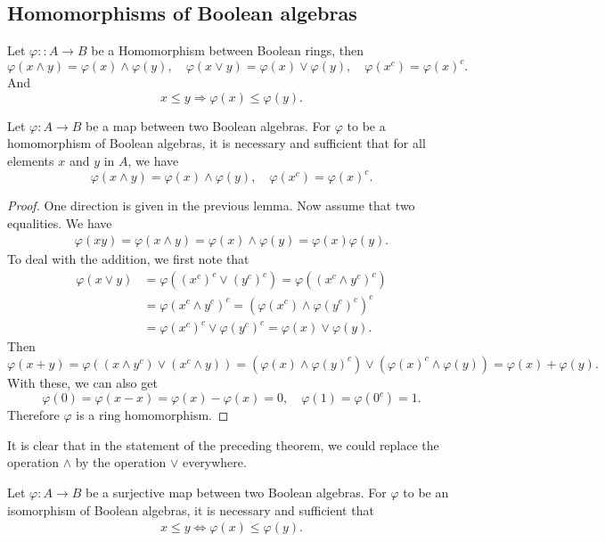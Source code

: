 \subsection{Homomorphisms of Boolean algebras}
\begin{lemma}\label{Bool ring homomorphism prop}
Let $\varphi::A\to B$ be a Homomorphism between Boolean rings, then
\[\varphi(x\wedge y)=\varphi(x)\wedge\varphi(y),\quad \varphi(x\vee y)=\varphi(x)\vee\varphi(y),\quad \varphi(x^c)=\varphi(x)^c.\]
And
\[x\leq y\Rightarrow \varphi(x)\leq\varphi(y).\]
\end{lemma}
\begin{theorem}\label{Bool ring homomorphism iff}
Let $\varphi:A\to B$ be a map between two Boolean algebras. For $\varphi$ to be a homomorphism of Boolean algebras, it is necessary 
and sufficient that for all elements $x$ and $y$ in $A$, we have
\[\varphi(x\wedge y)=\varphi(x)\wedge\varphi(y),\quad \varphi(x^c)=\varphi(x)^c.\]
\end{theorem}
\begin{proof}
One direction is given in the previous lemma. Now assume that two equalities. We have
\begin{align*}
\varphi(xy)=\varphi(x\wedge y)=\varphi(x)\wedge\varphi(y)=\varphi(x)\varphi(y).
\end{align*}
To deal with the addition, we first note that
\begin{align*}
\varphi(x\vee y)&=\varphi((x^c)^c\vee (y^c)^c)=\varphi((x^c\wedge y^c)^c)\\
&=\varphi(x^c\wedge y^c)^c=(\varphi(x^c)\wedge\varphi(y^c)^c)^c\\
&=\varphi(x^c)^c\vee\varphi(y^c)^c=\varphi(x)\vee\varphi(y).
\end{align*}
Then
\[\varphi(x+y)=\varphi((x\wedge y^c)\vee(x^c\wedge y))=(\varphi(x)\wedge\varphi(y)^c)\vee(\varphi(x)^c\wedge\varphi(y))=\varphi(x)+\varphi(y).\]
With these, we can also get
\[\varphi(0)=\varphi(x-x)=\varphi(x)-\varphi(x)=0,\quad \varphi(1)=\varphi(0^c)=1.\]
Therefore $\varphi$ is a ring homomorphism.
\end{proof}
\begin{remark}
It is clear that in the statement of the preceding theorem, we could replace the operation $\wedge$ by the operation $\vee$ everywhere.
\end{remark}
\begin{theorem}\label{Bool ring isomomorphism iff}
Let $\varphi:A\to B$ be a surjective map between two Boolean algebras. For $\varphi$ to be an isomorphism 
of Boolean algebras, it is necessary and sufficient that
\begin{align}\label{Bool ring isomomorphism iff-1}
x\leq y\iff \varphi(x)\leq\varphi(y).
\end{align}
\end{theorem}
